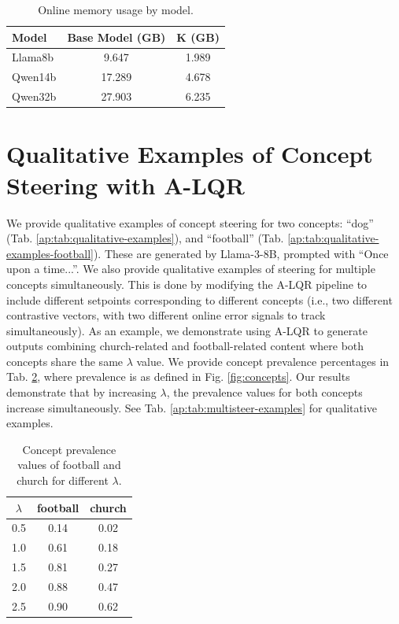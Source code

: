 \documentclass{article}
\theoremstyle{plain}
\theoremstyle{definition}
\theoremstyle{remark}
\begin{document}
\begin{table}[htbp]
\centering
\begin{threeparttable}
\caption{Online memory usage by model.}\label{ap:tab:on_memory_allocation}
\begin{tabular}{lcc}
\toprule
Model & Base Model (GB) & K (GB) \\
\midrule
Llama8b  & 9.647  & 1.989 \\
Qwen14b  & 17.289 & 4.678 \\
Qwen32b  & 27.903 & 6.235 \\
\bottomrule
\end{tabular}
\end{threeparttable}
\end{table}

\FloatBarrier
\section{Qualitative Examples of Concept Steering with A-LQR}\label{ap:sec:qualitative.}
We provide qualitative examples of concept steering for two concepts: ``dog'' (Tab. \ref{ap:tab:qualitative-examples}), and ``football'' (Tab. \ref{ap:tab:qualitative-examples-football}). These are generated by Llama-3-8B, prompted with ``Once upon a time...''. We also provide qualitative examples of steering for multiple concepts simultaneously. This is done by modifying the A-LQR pipeline to include different setpoints corresponding to different concepts (i.e., two different contrastive vectors, with two different online error signals to track simultaneously). As an example, we demonstrate using A-LQR to generate outputs combining church-related and football-related content where both concepts share the same 
$\lambda$ value. We provide concept prevalence percentages in Tab. \ref{tab:lambda_values}, where prevalence is as defined in Fig. \ref{fig:concepts}. Our results demonstrate that by increasing $\lambda$, the prevalence values for both concepts increase simultaneously. See Tab. \ref{ap:tab:multisteer-examples} for qualitative examples.

\begin{table}[ht]
\centering
\begin{tabular}{c c c}
\hline
$\lambda$ & football & church \\
\hline
0.5 & 0.14 & 0.02 \\
1.0 & 0.61 & 0.18 \\
1.5 & 0.81 & 0.27 \\
2.0 & 0.88 & 0.47 \\
2.5 & 0.90 & 0.62 \\
\hline
\end{tabular}
\caption{Concept prevalence values of football and church for different $\lambda$.}
\label{tab:lambda_values}
\end{table}
\end{document}
